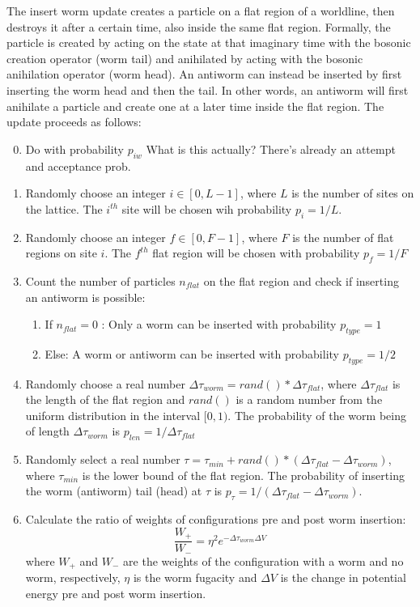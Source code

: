 \documentclass[12pt, two sided]{article}
\begin{document}
    The insert worm update creates a particle on a flat region of a worldline, then destroys it after a certain time, also inside the same flat region. Formally, the particle is created by acting on the state at that imaginary time with the bosonic creation operator (worm tail) and anihilated by acting with the bosonic anihilation operator (worm head). An antiworm can instead be inserted by first inserting the worm head and then the tail. In other words, an antiworm will first anihilate a particle and create one at a later time inside the flat region. The update proceeds as follows:
%
    \begin{enumerate}
        \setcounter{enumi}{-1}
    \item Do with probability $p_{iw}$ {\color{red} What is this actually? There's already an attempt and acceptance prob.}
        \item Randomly choose an integer $i \in [0,L-1]$, where $L$ is the number of sites on the lattice. The $i^{th}$ site will be chosen wih probability $p_i = 1/L$.
        \item Randomly choose an integer $f \in [0,F - 1]$, where $F$ is the number of flat regions on site $i$. The $f^{th}$ flat region will be chosen with probability $p_{f} = 1/F$
        \item Count the number of particles $n_{flat}$ on the flat region and check if inserting an antiworm is possible:
            \begin{enumerate}
            \item If $n_{flat} = 0$ : Only a worm can be inserted with probability $p_{type} = 1$
            \item Else: A worm or antiworm can be inserted with probability $p_{type} = 1/2$
            \end{enumerate}
        \item Randomly choose a real number $\Delta\tau_{worm} = rand()*\Delta\tau_{flat}$, where $\Delta\tau_{flat}$ is the length of the flat region and $rand()$ is a random number from the uniform distribution in the interval $[0,1)$. The probability of the worm being of length $\Delta\tau_{worm}$ is $p_{len} = 1/{\Delta\tau_{flat}}$
        \item Randomly select a real number $\tau = \tau_{min} + rand()*(\Delta\tau_{flat}-\Delta\tau_{worm})$, where $\tau_{min}$ is the lower bound of the flat region. The probability of inserting the worm (antiworm) tail (head) at $\tau$ is $p_{\tau} = 1/(\Delta\tau_{flat} - \Delta\tau_{worm})$.
        \item Calculate the ratio of weights of configurations pre and post worm insertion:
            \begin{equation}
            \frac{W_+}{W_-} = \eta^2 e^{-\Delta\tau_{worm} \Delta V}
            \label{eq:insert_ratios}
            \end{equation}
            where $W_+$ and $W_-$ are the weights of the configuration with a worm and no worm, respectively, $\eta$ is the worm fugacity and $\Delta V$ is the change in potential energy pre and post worm insertion. 
    \end{enumerate}
\end{document}
